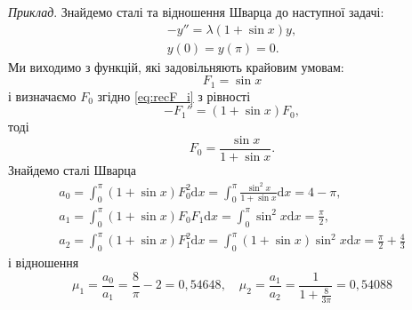 \documentclass[12pt,a4paper]{article}
\begin{document}
\emph{Приклад}. Знайдемо сталі та відношення Шварца до наступної задачі:
\[
\begin{array}{l}
	-y'' = \lambda (1 + \sin x) y, \\
	y(0) = y(\pi) = 0.
\end{array}
\]
Ми виходимо з функцій, які задовільняють крайовим умовам:
\[
	F_1 = \sin x
\]
і визначаємо $F_0$ згідно \eqref{eq:recF_i} з рівності
\[
	-F_1'' = (1 + \sin x) F_0,
\]
тоді
\[
	F_0 = \frac{\sin x}{1 + \sin x}.
\]
Знайдемо сталі Шварца
\[
\begin{array}{l}
	a_0 = \int_0^{\pi}(1 + \sin x) F_0^2 \mathrm{d}x = \int_0^{\pi} \frac{\sin^2 x}{1 + \sin x} \mathrm{d}x = 4 - \pi, \\
	a_1 = \int_0^{\pi}(1 + \sin x) F_0 F_1 \mathrm{d}x = \int_0^{\pi} \sin^2 x \mathrm{d}x = \frac{\pi}{2}, \\
	a_2 = \int_0^{\pi}(1 + \sin x) F_1^2 \mathrm{d}x = \int_0^{\pi} (1 + \sin x) \sin^2 x \mathrm{d}x = \frac{\pi}{2} + \frac{4}{3}
\end{array}
\]
і відношення
\[
	\mu_1 = \frac{a_0}{a_1} = \frac{8}{\pi} - 2 = 0,54648
	, \quad
	\mu_2 = \frac{a_1}{a_2} = \frac{1}{1 + \frac{8}{3\pi}} = 0,54088
\]
\end{document}
